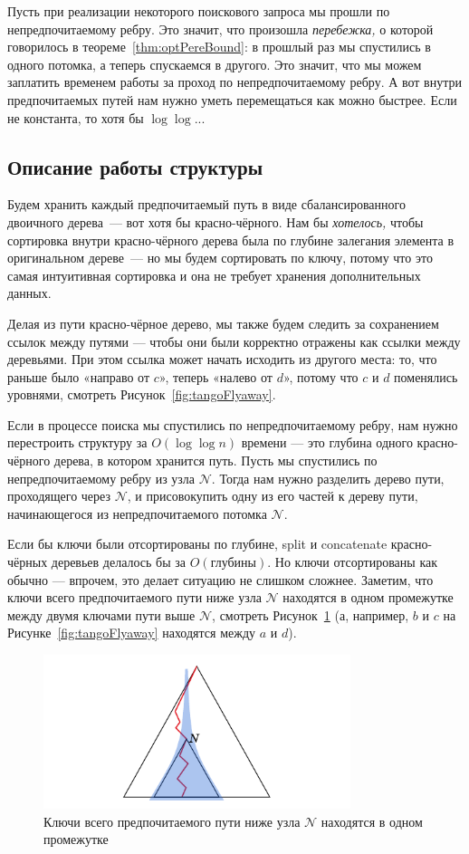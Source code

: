 Пусть при реализации некоторого поискового запроса мы прошли по непредпочитаемому ребру. Это значит, что произошла {\it перебежка,} о которой говорилось в теореме~\ref{thm:optPereBound}: в прошлый раз мы спустились в одного потомка, а теперь спускаемся в другого. Это значит, что мы можем заплатить временем работы за проход по непредпочитаемому ребру. А вот внутри предпочитаемых путей нам нужно уметь перемещаться как можно быстрее. Если не константа, то хотя бы $\log \log$...

\subsection{Описание работы структуры}

Будем хранить каждый предпочитаемый путь в виде сбалансированного двоичного дерева~— вот хотя бы красно-чёрного. Нам бы {\it хотелось,} чтобы сортировка внутри красно-чёрного дерева была по глубине залегания элемента в оригинальном дереве~— но мы будем сортировать по ключу, потому что это самая интуитивная сортировка и она не требует хранения дополнительных данных.

Делая из пути красно-чёрное дерево, мы также будем следить за сохранением ссылок между путями — чтобы они были корректно отражены как ссылки между деревьями. При этом ссылка может начать исходить из другого места: то, что раньше было «направо от $c$», теперь «налево от $d$», потому что $c$ и $d$ поменялись уровнями, смотреть Рисунок~\ref{fig:tangoFlyaway}. 

Если в процессе поиска мы спустились по непредпочитаемому ребру, нам нужно перестроить структуру за $O (\log \log n)$ времени — это глубина одного красно-чёрного дерева, в котором хранится путь. Пусть мы спустились по непредпочитаемому ребру из узла $\mathcal N$. Тогда нам нужно разделить дерево пути, проходящего через $\mathcal N$, и присовокупить одну из его частей к дереву пути, начинающегося из непредпочитаемого потомка $\mathcal N$.

Если бы ключи были отсортированы по глубине, split и concatenate красно-чёрных деревьев делалось бы за $O(\text{глубины})$. Но ключи отсортированы как обычно — впрочем, это делает ситуацию не слишком сложнее. Заметим, что ключи всего предпочитаемого пути ниже узла $\mathcal N$ находятся в одном промежутке между двумя ключами пути выше $\mathcal N$, смотреть Рисунок~\ref{fig:tangoCut} (а, например, $b$ и $c$ на Рисунке~\ref{fig:tangoFlyaway} находятся между $a$ и $d$).

\begin{figure} \centering
	\includegraphics[height=45mm]{img/tangoCut}
	\caption{Ключи всего предпочитаемого пути ниже узла $\mathcal N$
	     находятся в одном промежутке}
	\label{fig:tangoCut}
\end{figure}

